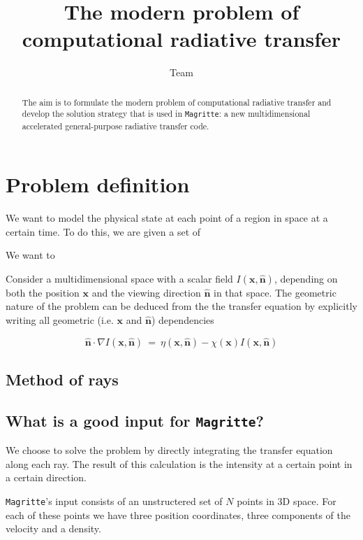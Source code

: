 \documentclass[]{article}
\title{ The modern problem of computational radiative transfer }
\author{ Team \Magritte }
\date{}
\newcommand{\x}{\textbf{x}}
\newcommand{\n}{\hat{\textbf{n}}}
\newcommand{\e}{ \ = \ }
\newcommand{\Magritte}{\texttt{Magritte}}
\begin{document}
\maketitle


\begin{abstract}
The aim is to formulate the modern problem of computational radiative transfer and develop the solution strategy that is used in \Magritte: a new multidimensional accelerated general-purpose radiative transfer code.
\end{abstract}



\section{Problem definition}


We want to model the physical state at each point of a region in space at a certain time. To do this, we are given a set of

\bigskip

We want to

\bigskip

Consider a multidimensional space with a scalar field $I(\x,\n)$, depending on both the position $\x$ and the viewing direction $\n$ in that space. The geometric nature of the problem can be deduced from the the transfer equation by explicitly writing all geometric (i.e. $\x$ and $\n$) dependencies


\begin{equation}
\n \cdot \nabla I(\x,\n) \e \eta(\x,\n) - \chi(\x) I(\x,\n)
\end{equation}


\subsection{Method of rays}

\subsection{What is a good input for \Magritte?}
We choose to solve the problem by directly integrating the transfer equation along each ray. The result of this calculation is the intensity at a certain point in a certain direction.


\Magritte's input consists of an unstructered set of $N$ points in 3D space. For each of these points we have three position coordinates, three components of the velocity and a density.
\end{document}
